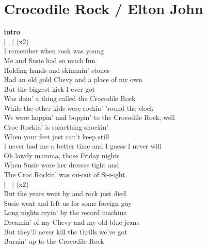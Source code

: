 \section{Crocodile Rock / Elton John}\label{sec:crocodilerock}

\Gmajor
\Eminor
\Cmajor
\DmajorEasy
\Aseven
\Dseven
\EmajorEasy
\Bminor
\Cseven


\textbf{intro}\\
  |   |   |   (x2)\\
I remember when rock was young\\
Me and Susie had so much fun\\
Holding hands and skimmin' stones\\
Had an old gold Chevy and a place of my own\\
But the biggest kick I ever got\\
Was doin' a thing called the Crocodile Rock\\
While the other kids were rockin' 'round the clock\\
We were hoppin’ and boppin’ to the Crocodile Rock, well\\
 Croc Rockin' is something shockin'\\
When your feet just can't keep still\\
 I never had me a better time and I guess I never will\\
Oh lawdy mamma, those Friday nights\\
When Susie wore her dresses tight and\\
The Croc Rockin' was ou-out of Si-i-ight\\
  |   |   |   (x2)\\
But the years went by and rock just died\\
Susie went and left us for some foreign guy\\
Long nights cryin' by the record machine\\
Dreamin' of my Chevy and my old blue jeans\\
But they'll never kill the thrills we've got\\
Burnin' up to the Crocodile Rock\\
